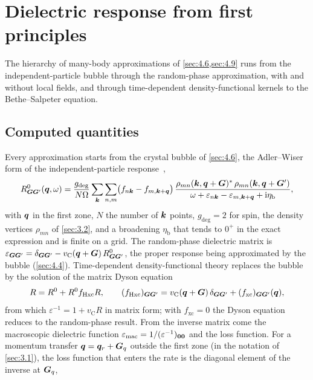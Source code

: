 \section{Dielectric response from first principles}\label{app:E.6}

The hierarchy of many-body approximations of \cref{sec:4.6,sec:4.9} runs from the independent-particle bubble through the random-phase approximation, with and without local fields, and through time-dependent density-functional kernels to the Bethe--Salpeter equation.

\subsection{Computed quantities}

Every approximation starts from the crystal bubble of \cref{sec:4.6}, the Adler--Wiser form of the independent-particle response~\cite{adler1962quantum,wiser1963dielectric},
\begin{equation}
  R^0_{\bm{G}\bm{G}'}(\bm{q},\omega) = \frac{g_{\mathrm{deg}}}{N\Omega}\sum_{\bm{k}}\sum_{n,m}
  \bigl(f_{n\bm{k}} - f_{m,\bm{k}+\bm{q}}\bigr)\,
  \frac{\rho_{mn}(\bm{k},\bm{q}+\bm{G})^*\,\rho_{mn}(\bm{k},\bm{q}+\bm{G}')}{\omega + \varepsilon_{n\bm{k}} - \varepsilon_{m,\bm{k}+\bm{q}} + \mathrm{i}\eta_{\mathrm{b}}} ,
  \label{eq:E.6-R0}
\end{equation}
with $\bm{q}$ in the first zone, $N$ the number of $\bm{k}$ points, $g_{\mathrm{deg}} = 2$ for spin, the density vertices $\rho_{mn}$ of \cref{sec:3.2}, and a broadening $\eta_{\mathrm{b}}$ that tends to $0^+$ in the exact expression and is finite on a grid. The random-phase dielectric matrix is $\varepsilon_{\bm{G}\bm{G}'} = \delta_{\bm{G}\bm{G}'} - v_{\mathrm{C}}(\bm{q}+\bm{G})\,R^0_{\bm{G}\bm{G}'}$, the proper response being approximated by the bubble (\cref{sec:4.4}). Time-dependent density-functional theory replaces the bubble by the solution of the matrix Dyson equation
\begin{equation}
  R = R^0 + R^0 f_{\mathrm{Hxc}} R , \qquad (f_{\mathrm{Hxc}})_{\bm{G}\bm{G}'} = v_{\mathrm{C}}(\bm{q}+\bm{G})\,\delta_{\bm{G}\bm{G}'} + (f_{\mathrm{xc}})_{\bm{G}\bm{G}'}(\bm{q}),
  \label{eq:E.6-dyson}
\end{equation}
from which $\varepsilon^{-1} = 1 + v_{\mathrm{C}}R$ in matrix form; with $f_{\mathrm{xc}} = 0$ the Dyson equation reduces to the random-phase result. From the inverse matrix come the macroscopic dielectric function $\varepsilon_{\mathrm{mac}} = 1/(\varepsilon^{-1})_{\bm{0}\bm{0}}$ and the loss function. For a momentum transfer $\bm{q} = \bm{q}_r + \bm{G}_q$ outside the first zone (in the notation of \cref{sec:3.1}), the loss function that enters the rate is the diagonal element of the inverse at $\bm{G}_q$,
